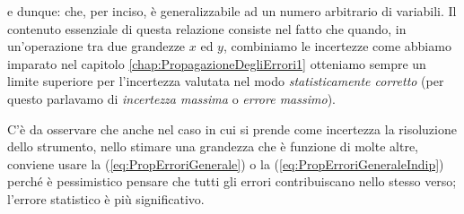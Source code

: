 e dunque:
che, per inciso, \`e generalizzabile ad un numero arbitrario di
variabili.
Il contenuto essenziale di questa relazione consiste nel fatto che
quando, in un'operazione tra due grandezze $x$ ed $y$,
combiniamo le incertezze come abbiamo imparato nel capitolo
\ref{chap:PropagazioneDegliErrori1} otteniamo sempre un limite superiore
per l'incertezza valutata nel modo {\itshape statisticamente
corretto} (per questo parlavamo di {\itshape incertezza massima} o
{\itshape errore massimo}).

\begin{exemplify}


\end{exemplify}

C'\`e da osservare che anche nel caso in cui si prende come incertezza la
risoluzione dello strumento, nello stimare una grandezza che \`e funzione di
molte altre, conviene usare la (\ref{eq:PropErroriGenerale}) o la
(\ref{eq:PropErroriGeneraleIndip}) perch\'e \`e pessimistico pensare che
tutti gli errori contribuiscano nello stesso verso; l'errore statistico
\`e pi\`u significativo.


